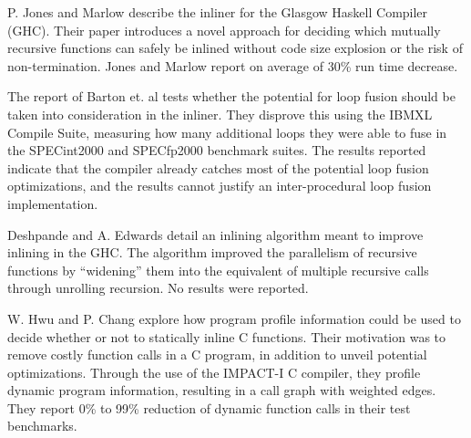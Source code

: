P. Jones and Marlow \cite{GHCPaper} describe the inliner for the Glasgow Haskell
Compiler (GHC). Their paper introduces a novel approach for deciding which
mutually recursive functions can safely be inlined without code size explosion
or the risk of non-termination. Jones and Marlow report on average of 30\% run
time decrease.

The report of Barton et. al \cite{ShouldLoopOptsInfluenceInlining} tests whether
the potential for loop fusion should be taken into consideration in the inliner.
They disprove this using the IBM\textregistered XL Compile Suite, measuring how
many additional loops they were able to fuse in the SPECint2000 and SPECfp2000
benchmark suites. The results reported indicate that the compiler already
catches most of the potential loop fusion optimizations, and the results cannot
justify an inter-procedural loop fusion implementation.

Deshpande and A. Edwards \cite{deshpande2012statically} detail an inlining
algorithm meant to improve inlining in the GHC. The algorithm improved the
parallelism of recursive functions by ``widening'' them into the equivalent of
multiple recursive calls through unrolling recursion. No results were reported.

W. Hwu and P. Chang \cite{InlineFuncExpCProgs} explore how program profile
information could be used to decide whether or not to statically inline C
functions. Their motivation was to remove costly function calls in a C program,
in addition to unveil potential optimizations. Through the use of the IMPACT-I C
compiler, they profile dynamic program information, resulting in a call graph
with weighted edges. They report 0\% to 99\% reduction of dynamic function calls
in their test benchmarks.
